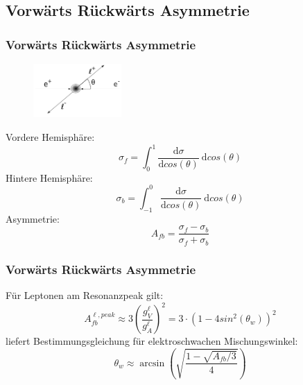 \subsection{Vorwärts Rückwärts Asymmetrie}
\begin{frame}
	\frametitle{Vorwärts Rückwärts Asymmetrie}
	\begin{figure}
		\includegraphics[width=0.3\textwidth]{graphics/AsymmetrieWinkel}
	\end{figure}

		Vordere Hemisphäre:
		\begin{equation*}
		\sigma_f=\int_{0}^{1}\frac{\text{d}\sigma}{\text{d}cos(\theta)}~\text{d}cos(\theta)
		\end{equation*}
		Hintere Hemisphäre:
		\begin{equation*}
		\sigma_b=\int_{-1}^{0}\frac{\text{d}\sigma}{\text{d}cos(\theta)}~\text{d}cos(\theta)
		\end{equation*}
		Asymmetrie:
		\begin{equation*}
		A_{fb}=\frac{\sigma_f-\sigma_b}{\sigma_f+\sigma_b}
		\end{equation*}
\end{frame}
\begin{frame}
	\frametitle{Vorwärts Rückwärts Asymmetrie}
		Für Leptonen am Resonanzpeak gilt:
		\begin{equation*}
		A_{fb}^{\ell,peak}\approx 3 \left ( \frac{g^{\ell}_V}{g^{\ell}_A} \right )^2=3\cdot (1-4 sin^2(\theta_w))^2
		\end{equation*}
		liefert Bestimmungsgleichung für elektroschwachen Mischungswinkel:
		\begin{equation*}
		\theta_w\approx\arcsin(\sqrt{\frac{1-\sqrt{A_{fb}/3}}{4}})
		\end{equation*}
\end{frame}